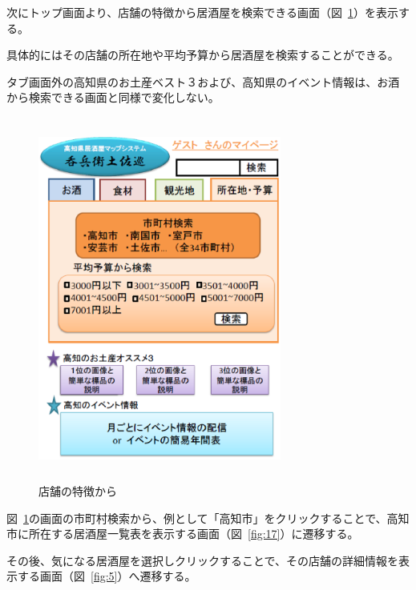 \documentclass[a4j,titlepage]{jarticle}
\begin{document}
次にトップ画面より、店舗の特徴から居酒屋を検索できる画面（図~\ref{fig:16}）を表示する。



具体的にはその店舗の所在地や平均予算から居酒屋を検索することができる。



タブ画面外の高知県のお土産ベスト３および、高知県のイベント情報は、お酒から検索できる画面と同様で変化しない。
\clearpage
\begin {figure}[!htbp]
    \begin{center}
    \includegraphics [height=12cm, width=8cm]{16.eps}
    \caption {店舗の特徴から}
    \label {fig:16}
    \end{center}
\end {figure}



図~\ref{fig:16}の画面の市町村検索から、例として「高知市」をクリックすることで、高知市に所在する居酒屋一覧表を表示する画面（図~\ref{fig:17}）に遷移する。



その後、気になる居酒屋を選択しクリックすることで、その店舗の詳細情報を表示する画面（図~\ref{fig:5}）へ遷移する。
\clearpage
\end{document}

